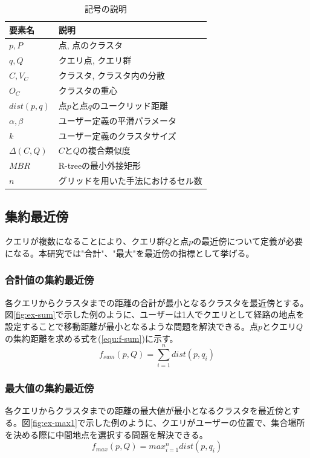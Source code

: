 \documentclass{deimj}
\begin{document}
\begin{table}[htb]
  \begin{center}
    \begin{tabular}{|l|l|} \hline
      要素名 & 説明 \\ \hline \hline
      $p, P$ & 点, 点のクラスタ \\ \hline
      $q, Q$ & クエリ点, クエリ群 \\ \hline
      $C, V_C$ & クラスタ, クラスタ内の分散 \\ \hline
      $O_C$ & クラスタの重心 \\ \hline
      $dist(p,q)$ & 点$p$と点$q$のユークリッド距離 \\ \hline
      $\alpha, \beta$ & ユーザー定義の平滑パラメータ \\ \hline
      $k$ & ユーザー定義のクラスタサイズ \\ \hline
      $\Delta(C,Q)$ & $C$と$Q$の複合類似度 \\ \hline
      $MBR$ & R-treeの最小外接矩形 \\ \hline
      $n$ & グリッドを用いた手法におけるセル数 \\ \hline
    \end{tabular}
    \caption{記号の説明}
    \label{tab:var}
  \end{center}
\end{table}

\subsection{集約最近傍}
クエリが複数になることにより、クエリ群$Q$と点$p$の最近傍について定義が必要になる。本研究では"合計"、"最大"を最近傍の指標として挙げる。
\subsubsection{合計値の集約最近傍}
各クエリからクラスタまでの距離の合計が最小となるクラスタを最近傍とする。図\ref{fig:ex-sum}で示した例のように、ユーザーは1人でクエリとして経路の地点を設定することで移動距離が最小となるような問題を解決できる。点$p$とクエリ$Q$の集約距離を求める式を(\ref{equ:f-sum})に示す。
\begin{equation}
\label{equ:f-sum}
f_{sum}(p,Q) = \sum_{i=1}^{n} dist(p,q_i)
\end{equation}

\subsubsection{最大値の集約最近傍}
各クエリからクラスタまでの距離の最大値が最小となるクラスタを最近傍とする。図\ref{fig:ex-max1}で示した例のように、クエリがユーザーの位置で、集合場所を決める際に中間地点を選択する問題を解決できる。
\begin{equation}
\label{equ:f-max}
f_{max}(p,Q) = max_{i=1}^{n} dist(p,q_i)
\end{equation}
\end{document}
